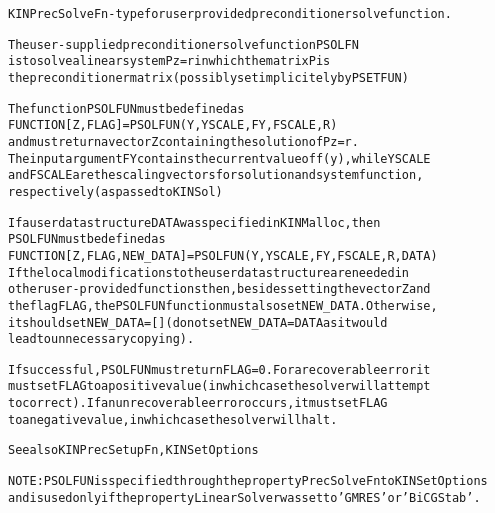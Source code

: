 \begin{alltt}
KINPrecSolveFn - type for user provided preconditioner solve function.

   The user-supplied preconditioner solve function PSOLFN
   is to solve a linear system P z = r in which the matrix P is
   the preconditioner matrix (possibly set implicitely by PSETFUN)

   The function PSOLFUN must be defined as 
        FUNCTION [Z, FLAG] = PSOLFUN(Y, YSCALE, FY, FSCALE, R)
   and must return a vector Z containing the solution of Pz=r.
   The input argument FY contains the current value of f(y), while YSCALE
   and FSCALE are the scaling vectors for solution and system function,
   respectively (as passed to KINSol)

   If a user data structure DATA was specified in KINMalloc, then
   PSOLFUN must be defined as
        FUNCTION [Z, FLAG, NEW_DATA] = PSOLFUN(Y,YSCALE,FY,FSCALE,R,DATA)
   If the local modifications to the user data structure are needed in
   other user-provided functions then, besides setting the vector Z and
   the flag FLAG, the PSOLFUN function must also set NEW_DATA. Otherwise,
   it should set NEW_DATA=[] (do not set NEW_DATA = DATA as it would
   lead to unnecessary copying).

   If successful, PSOLFUN must return FLAG=0. For a recoverable error it 
   must set FLAG to a positive value (in which case the solver will attempt 
   to correct). If an unrecoverable error occurs, it must set FLAG
   to a negative value, in which case the solver will halt.

   See also KINPrecSetupFn, KINSetOptions

   NOTE: PSOLFUN is specified through the property PrecSolveFn to KINSetOptions
   and is used only if the property LinearSolver was set to 'GMRES' or 'BiCGStab'.
\end{alltt}






\vspace{0.1in}
